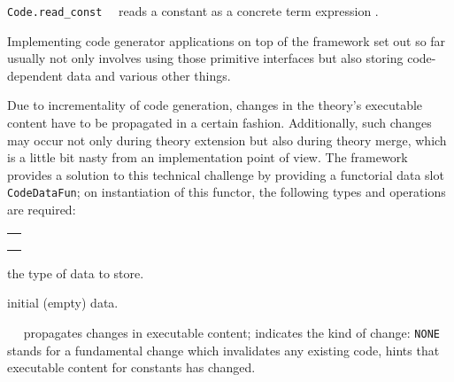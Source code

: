 \begin{isabellebody}
\begin{isamarkuptext}
  \begin{description}

  \item \verb|Code.read_const|~~
     reads a constant as a concrete term expression .

  \end{description}%
\end{isamarkuptext}%
\isamarkuptrue%
%
\endisatagmlref
{\isafoldmlref}%
%
\isadelimmlref
%
\endisadelimmlref
%
\isamarkuptrue%
%
\begin{isamarkuptext}%
Implementing code generator applications on top
  of the framework set out so far usually not only
  involves using those primitive interfaces
  but also storing code-dependent data and various
  other things.%
\end{isamarkuptext}%
\isamarkuptrue%
%
\isamarkuptrue%
%
\begin{isamarkuptext}%
Due to incrementality of code generation, changes in the
  theory's executable content have to be propagated in a
  certain fashion.  Additionally, such changes may occur
  not only during theory extension but also during theory
  merge, which is a little bit nasty from an implementation
  point of view.  The framework provides a solution
  to this technical challenge by providing a functorial
  data slot \verb|CodeDataFun|; on instantiation
  of this functor, the following types and operations
  are required:

  \medskip
  \begin{tabular}{l}
  \isa{type\ T} \\
  \isa{val\ empty{\isacharcolon}\ T} \\
  \isa{val\ purge{\isacharcolon}\ theory\ {\isasymrightarrow}\ string\ list\ option\ {\isasymrightarrow}\ T\ {\isasymrightarrow}\ T}
  \end{tabular}

  \begin{description}

  \item {} the type of data to store.

  \item {} initial (empty) data.

  \item {}~~ propagates changes in executable content;
     indicates the kind
    of change: \verb|NONE| stands for a fundamental change
    which invalidates any existing code, 
    hints that executable content for constants 
    has changed.


\end{description}
\end{isamarkuptext}
\end{isabellebody}
